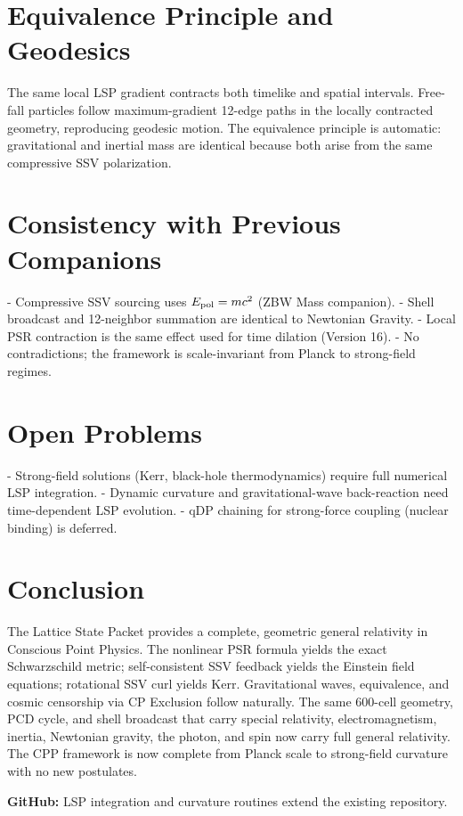 \documentclass[12pt]{article}
\begin{document}
\section{Equivalence Principle and Geodesics}
The same local LSP gradient contracts both timelike and spatial intervals. Free-fall particles follow maximum-gradient 12-edge paths in the locally contracted geometry, reproducing geodesic motion. The equivalence principle is automatic: gravitational and inertial mass are identical because both arise from the same compressive SSV polarization.

\section{Consistency with Previous Companions}
- Compressive SSV sourcing uses \(E_{\rm pol} = mc^2\) (ZBW Mass companion).
- Shell broadcast and 12-neighbor summation are identical to Newtonian Gravity.
- Local PSR contraction is the same effect used for time dilation (Version 16).
- No contradictions; the framework is scale-invariant from Planck to strong-field regimes.

\section{Open Problems}
- Strong-field solutions (Kerr, black-hole thermodynamics) require full numerical LSP integration.
- Dynamic curvature and gravitational-wave back-reaction need time-dependent LSP evolution.
- qDP chaining for strong-force coupling (nuclear binding) is deferred.

\section{Conclusion}
The Lattice State Packet provides a complete, geometric general relativity in Conscious Point Physics. The nonlinear PSR formula yields the exact Schwarzschild metric; self-consistent SSV feedback yields the Einstein field equations; rotational SSV curl yields Kerr. Gravitational waves, equivalence, and cosmic censorship via CP Exclusion follow naturally. The same 600-cell geometry, PCD cycle, and shell broadcast that carry special relativity, electromagnetism, inertia, Newtonian gravity, the photon, and spin now carry full general relativity. The CPP framework is now complete from Planck scale to strong-field curvature with no new postulates.

\textbf{GitHub:} LSP integration and curvature routines extend the existing repository.
\end{document}

